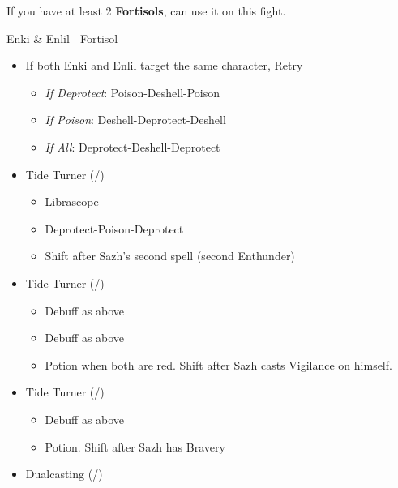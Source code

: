 \renewcommand{\first}{[1] Slash \& Burn (\rav/\com)}
\renewcommand{\second}{[2] Tide Turner (\sab/\syn)}
\renewcommand{\third}{[3] Tide Turner (\sab/\syn)}
\renewcommand{\fourth}{[4] Dualcasting (\rav/\rav)}
\renewcommand{\fifth}{[5] Undermine (\sab/\rav)}
\renewcommand{\sixth}{[6] Divide \& Conquer (\sab/\com)}
\newpage
If you have at least 2 \textbf{Fortisols}, can use it on this fight.
\begin{battle}[1:41 $|$ 1:30]{Enki \& Enlil $|$ Fortisol}
  \begin{multicols}{2}
    \begin{itemize}
      \item If both Enki and Enlil target the same character, Retry

            \begin{itemize}
              \item \textit{If Deprotect}: Poison-Deshell-Poison
              \item \textit{If Poison}: Deshell-Deprotect-Deshell
              \item \textit{If All}: Deprotect-Deshell-Deprotect
            \end{itemize}
      \item \second
            \begin{itemize}
              \item Librascope
              \item Deprotect-Poison-Deprotect
              \item Shift after Sazh's second spell (second Enthunder)
            \end{itemize}
      \item \third
            \begin{itemize}
              \item Debuff as above
              \item Debuff as above
              \item Potion when both are red. Shift after Sazh casts Vigilance on himself.
            \end{itemize}
      \item \second
            \begin{itemize}
              \item Debuff as above
              \item Potion. Shift after Sazh has Bravery
            \end{itemize}
      \item \fourth
            \begin{itemize}

\end{itemize}
\end{itemize}
\end{multicols}
\end{battle}
